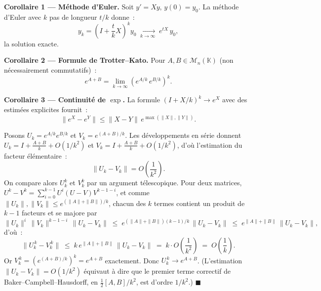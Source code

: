 \decsep{}


\begin{tcolorbox}[thmbox]
  \textbf{Corollaire 1 — Méthode d'Euler.}\enspace%
  Soit $y' = Xy$, $y(0) = y_0$. La méthode d'Euler avec $k$ pas de longueur
  $t/k$ donne~:
  \[
    y_k = \left(I + \frac{t}{k}X\right)^{\!k} y_0
    \;\xrightarrow[k\to\infty]{}\;
    e^{tX}\,y_0,
  \]
  la solution exacte.

  \medskip
  \textbf{Corollaire 2 — Formule de Trotter--Kato.}\enspace%
  Pour $A, B \in \mathcal{M}_n(\mathbb{K})$ (non nécessairement commutatifs)~:
  \[
    e^{A+B} = \lim_{k\to\infty}\!\left(e^{A/k}\,e^{B/k}\right)^k.
  \]

  \medskip
  \textbf{Corollaire 3 — Continuité de $\exp$.}\enspace
  La formule ${(I+X/k)}^k \to e^X$ avec des estimées explicites fournit~:
  \[
    \|e^X - e^Y\| \leq \|X - Y\|\,e^{\max(\|X\|,\|Y\|)}.
  \]
\end{tcolorbox}


\begin{mdframed}[style=proofbar]
  Posons $U_k = e^{A/k}e^{B/k}$ et $V_k = e^{(A+B)/k}$. Les développements en série
  donnent $U_k = I + \frac{A+B}{k} + O(1/k^2)$ et $V_k = I + \frac{A+B}{k} + O(1/k^2)$,
  d'où l'estimation du facteur élémentaire~:
  \[
    \|U_k - V_k\| = O\!\left(\frac{1}{k^2}\right).
  \]
  On compare alors $U_k^k$ et $V_k^k$ par un argument télescopique. Pour deux
  matrices, $\displaystyle U^k - V^k = \sum_{i=0}^{k-1} U^i (U-V) V^{k-1-i}$, et comme
  $\|U_k\|, \|V_k\| \leq e^{(\|A\|+\|B\|)/k}$, chacun des $k$ termes contient un produit
  de $k-1$ facteurs et se majore par
  \[
    \|U_k\|^i\,\|V_k\|^{k-1-i}\,\|U_k-V_k\|
    \;\leq\; e^{(\|A\|+\|B\|)(k-1)/k}\,\|U_k-V_k\|
    \;\leq\; e^{\|A\|+\|B\|}\,\|U_k-V_k\|,
  \]
  d'où~:
  \[
    \bigl\|U_k^{\,k} - V_k^{\,k}\bigr\|
    \;\leq\; k\,e^{\|A\|+\|B\|}\,\|U_k - V_k\|
    \;=\; k \cdot O\!\left(\frac{1}{k^2}\right)
    \;=\; O\!\left(\frac{1}{k}\right).
  \]
  Or $V_k^{\,k} = \left(e^{(A+B)/k}\right)^k = e^{A+B}$ exactement. Donc
  $U_k^{\,k} \to e^{A+B}$.
  (L'estimation $\|U_k - V_k\| = O(1/k^2)$ équivaut à dire que le premier terme
  correctif de Baker--Campbell--Hausdorff, en $\tfrac12[A,B]/k^2$, est d'ordre $1/k^2$.)
  \hfill$\blacksquare$
\end{mdframed}

